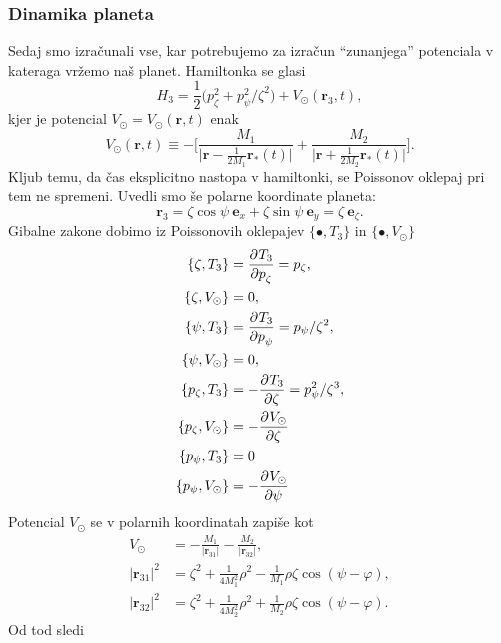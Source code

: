 \documentclass[12pt, a4paper]{article}
\renewcommand{\r}{
    \ensuremath{\mathbf{r}}
}
\newcommand{\ee}{
    \ensuremath{\mathbf{e}}
}
\newcommand{\der}[3][]{
    \ensuremath{ \frac{\partial^{#1} #2}{\partial #3^{#1}} }
}
\begin{document}
\subsubsection{Dinamika planeta}
Sedaj smo izra\v cunali vse, kar potrebujemo za izra\v cun "`zunanjega"' potenciala v kateraga vr\v zemo na\v s planet.
Hamiltonka se glasi
\begin{equation}
    H_3 = \frac{1}{2}\big(p_\zeta^2 + p_\psi^2/\zeta^2\big) + V_\odot(\r_3,t),
\end{equation}
kjer je potencial $V_\odot = V_\odot(\r, t)$ enak
\begin{equation}
    V_\odot (\r, t) \equiv -\Bigg[\frac{M_1}{\big|\r - \frac{1}{2M_1}\r_*(t)\big|}
        + \frac{M_2}{\big|\r + \frac{1}{2M_2}\r_*(t)\big|}\Bigg].
\end{equation}
Kljub temu, da \v cas eksplicitno nastopa v hamiltonki, se Poissonov oklepaj pri tem ne spremeni. Uvedli smo \v se
polarne koordinate planeta:
\[
    \r_3 = \zeta\cos\psi\ \ee_x + \zeta\sin\psi\ \ee_y = \zeta\ \ee_\zeta.
\]
Gibalne zakone dobimo iz Poissonovih oklepajev $\{\bullet, T_3\}$ in $\{\bullet, V_\odot\}$
\begin{align}
    \{\zeta, T_3\}        &= \der{T_3}{p_\zeta} = p_\zeta, \notag \\
    \{\zeta, V_\odot\}    &= 0, \notag \\
    \{\psi, T_3\}         &= \der{T_3}{p_\psi} = p_\psi/\zeta^2, \notag \\
    \{\psi, V_\odot\}     &= 0, \notag \\
    \{p_\zeta, T_3\}      &= -\der{T_3}{\zeta} = p^2_\psi/\zeta^3, \notag \\
    \{p_\zeta, V_\odot\}  &= -\der{V_\odot}{\zeta} \notag \\
    \{p_\psi, T_3\}       &= 0 \notag \\
    \{p_\psi, V_\odot\}   &= -\der{V_\odot}{\psi}
    \label{oklepaji}
\end{align}
Potencial $V_\odot$ se v polarnih koordinatah zapi\v se kot
\begin{align}
    V_\odot     &= -\frac{M_1}{|\r_{31}|} -\frac{M_2}{|\r_{32}|}, \\
    |\r_{31}|^2 &= \zeta^2 + \frac{1}{4M_1^2}\rho^2 - \frac{1}{M_1}\rho\zeta\cos(\psi - \varphi), \\
    |\r_{32}|^2 &= \zeta^2 + \frac{1}{4M_2^2}\rho^2 + \frac{1}{M_2}\rho\zeta\cos(\psi - \varphi).
\end{align}
Od tod sledi
\end{document}
